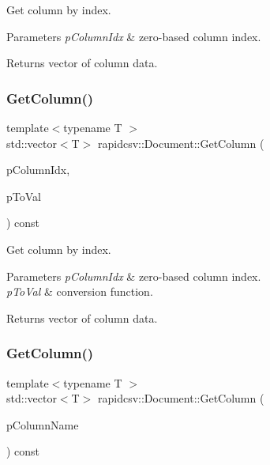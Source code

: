 Get column by index. 


\begin{DoxyParams}{Parameters}
{\em p\+Column\+Idx} & zero-\/based column index. \\
\hline
\end{DoxyParams}
\begin{DoxyReturn}{Returns}
vector of column data. 
\end{DoxyReturn}
\mbox{\label{classrapidcsv_1_1Document_af1aa3f4dcbcd2513522465369584cd75}} 
\subsubsection{\texorpdfstring{Get\+Column()}{GetColumn()}\hspace{0.1cm}{\footnotesize\ttfamily [2/4]}}
{\footnotesize\ttfamily template$<$typename T $>$ \\
std\+::vector$<$T$>$ rapidcsv\+::\+Document\+::\+Get\+Column (\begin{DoxyParamCaption}\item[{const size\+\_\+t}]{p\+Column\+Idx,  }\item[{Conv\+Func$<$ T $>$}]{p\+To\+Val }\end{DoxyParamCaption}) const\hspace{0.3cm}{\ttfamily [inline]}}



Get column by index. 


\begin{DoxyParams}{Parameters}
{\em p\+Column\+Idx} & zero-\/based column index. \\
\hline
{\em p\+To\+Val} & conversion function. \\
\hline
\end{DoxyParams}
\begin{DoxyReturn}{Returns}
vector of column data. 
\end{DoxyReturn}
\mbox{\label{classrapidcsv_1_1Document_a58380ae48f70f6e7110a905b45fea229}} 
\subsubsection{\texorpdfstring{Get\+Column()}{GetColumn()}\hspace{0.1cm}{\footnotesize\ttfamily [3/4]}}
{\footnotesize\ttfamily template$<$typename T $>$ \\
std\+::vector$<$T$>$ rapidcsv\+::\+Document\+::\+Get\+Column (\begin{DoxyParamCaption}\item[{const std\+::string \&}]{p\+Column\+Name }\end{DoxyParamCaption}) const\hspace{0.3cm}{\ttfamily [inline]}}



